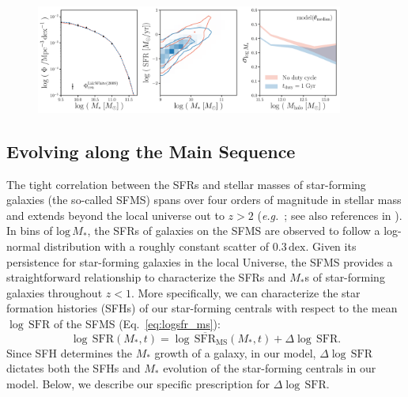 \documentclass[12pt, letterpaper, preprint]{aastex}
\newcommand{\beq}{\begin{equation}}
\newcommand{\eeq}{\end{equation}}
\newcommand{\logsfr}{\log \, \mathrm{SFR}}
\begin{document}
\begin{figure}
\begin{center}
\includegraphics[width=0.9\textwidth]{figs/qaplot_abc.pdf}
\caption{}
\label{fig:abc_demo}
\end{center}
\end{figure}

\subsection{Evolving along the Main Sequence} \label{sec:modelevol} 
The tight correlation between the SFRs and stellar masses of star-forming 
galaxies (the so-called SFMS) spans over four orders of magnitude in stellar 
mass and extends beyond the local universe out to $z > 2$ 
(\emph{e.g.}~\citealt{noeske2007,daddi2007,elbaz2007,salim2007,santini2009,karim2011,whitaker2012,moustakas2013,lee2015}; see also references in \citealt{speagle2014}). 
In bins of $\mathrm{log}\,M_*$, the SFRs of galaxies on the SFMS are observed
to follow a log-normal distribution with a roughly constant scatter of 
$0.3\,\mathrm{dex}$. Given its persistence for star-forming galaxies in 
the local Universe, the SFMS provides a straightforward relationship to 
characterize the SFRs and $M_*$s of star-forming galaxies 
throughout $z < 1$. More specifically, we can characterize the star formation
histories (SFHs) of our star-forming centrals with respect to the  mean 
$\logsfr$ of the SFMS (Eq.~\ref{eq:logsfr_ms}):
\beq \label{eq:logsfr_sf} 
\logsfr(M_*, t) = \log\,\overline{\mathrm{SFR}}_\mathrm{MS}(M_*, t) + \Delta \logsfr.
\eeq
Since SFH determines the $M_*$ growth of a galaxy, in our model, $\Delta \logsfr$
dictates both the SFHs and $M_*$ evolution of the star-forming centrals in our 
model. Below, we describe our specific prescription for $\Delta \logsfr$.
\end{document}
